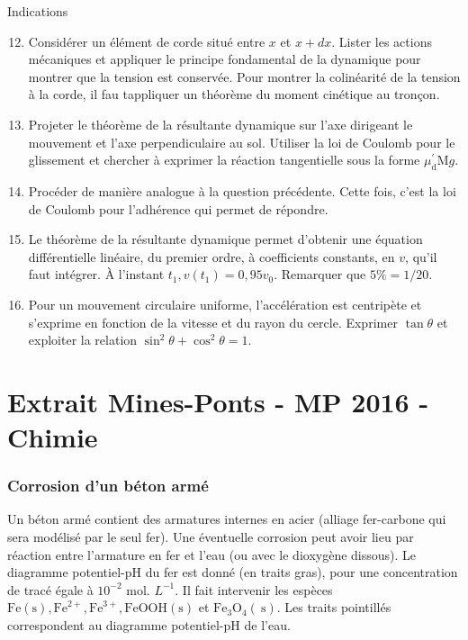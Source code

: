 \begin{bclogo}[logo=\bcoutil , noborder=True, couleur=yellow!10!white]{\hfill{Indications }}

\begin{enumerate}
  \setcounter{enumi}{11}
\item Considérer un élément de corde situé entre $x$ et $x+dx$. Lister les actions mécaniques et appliquer le principe fondamental de la dynamique pour montrer que la tension est conservée. Pour montrer la colinéarité de la tension à la corde, il fau tappliquer un théorème du moment cinétique au tronçon.
\item Projeter le théorème de la résultante dynamique sur l'axe dirigeant le mouvement et l'axe perpendiculaire au sol. Utiliser la loi de Coulomb pour le glissement et chercher à exprimer la réaction tangentielle sous la forme $\mu_{\mathrm{d}}^{\prime} \mathrm{M} g$.
\item Procéder de manière analogue à la question précédente. Cette fois, c'est la loi de Coulomb pour l'adhérence qui permet de répondre.
\item Le théorème de la résultante dynamique permet d'obtenir une équation différentielle linéaire, du premier ordre, à coefficients constants, en $v$, qu'il faut intégrer. À l'instant $t_1, v\left(t_1\right)=0,95 v_0$. Remarquer que $5 \%=1 / 20$.
\item Pour un mouvement circulaire uniforme, l'accélération est centripète et s'exprime en fonction de la vitesse et du rayon du cercle. Exprimer $\tan \theta$ et exploiter la relation $\sin ^2 \theta+\cos ^2 \theta=1$.
\end{enumerate}

\end{bclogo}


\newpage
\section*{Extrait Mines-Ponts - MP 2016 - Chimie}


\subsubsection*{Corrosion d'un béton armé}

Un béton armé contient des armatures internes en acier (alliage fer-carbone qui sera modélisé par le seul fer). Une éventuelle corrosion peut avoir lieu par réaction entre l'armature en fer et l'eau (ou avec le dioxygène dissous). Le diagramme potentiel-pH du fer est donné (en traits gras), pour une concentration de tracé égale à $10^{-2}$ mol. $L^{-1}$. Il fait intervenir les espèces $\mathrm{Fe}(\mathrm{s}), \mathrm{Fe}^{2+}, \mathrm{Fe}^{3+}, \mathrm{FeOOH}(\mathrm{s})$ et $\mathrm{Fe}_3 \mathrm{O}_4(\mathrm{~s})$. Les traits pointillés correspondent au diagramme potentiel-pH de l'eau.

